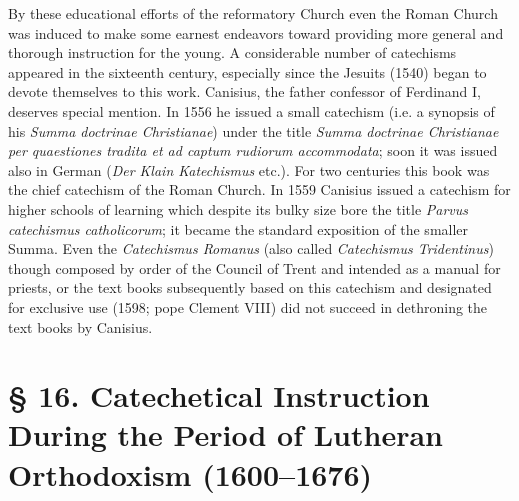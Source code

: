 By these educational efforts of the reformatory Church even the Roman Church was induced to make some earnest
endeavors toward providing more general and thorough instruction for the young. A considerable number of catechisms appeared in the sixteenth century, especially since the Jesuits (1540) began to devote themselves to this work. Canisius, the father confessor of Ferdinand I, deserves special mention. In 1556 he issued a small catechism (i.e. a synopsis of his \emph{Summa doctrinae Christianae}) under the title \emph{Summa doctrinae Christianae per quaestiones tradita et ad captum rudiorum accommodata}; soon it was issued also in German (\emph{Der Klain Katechismus} etc.). For two centuries this book was the chief catechism of the Roman Church. In 1559 Canisius issued a catechism for higher schools of learning which despite its bulky size bore the title \emph{Parvus catechismus catholicorum}; it became the standard exposition of the smaller Summa. Even the \emph{Catechismus Romanus} (also called \emph{Catechismus Tridentinus}) though composed by order of the Council of Trent and intended as a manual for priests, or the text books subsequently based on this catechism and designated for exclusive use (1598; pope Clement VIII) did not succeed in dethroning the text books by Canisius.

\section[§ 16. Lutheran Orthodoxism]{§ 16. Catechetical Instruction During the Period of Lutheran Orthodoxism (1600–1676)}

